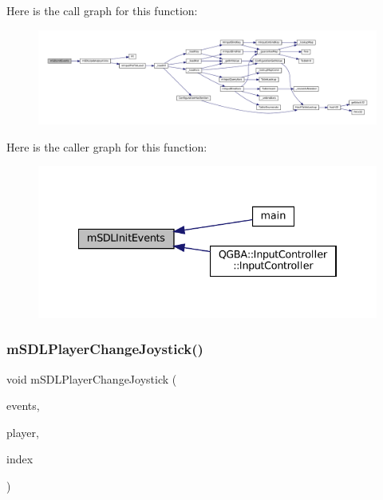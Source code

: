 Here is the call graph for this function\+:
\nopagebreak
\begin{figure}[H]
\begin{center}
\leavevmode
\includegraphics[width=350pt]{sdl-events_8c_a0529db4419b332c04fea23fff2467774_cgraph}
\end{center}
\end{figure}
Here is the caller graph for this function\+:
\nopagebreak
\begin{figure}[H]
\begin{center}
\leavevmode
\includegraphics[width=334pt]{sdl-events_8c_a0529db4419b332c04fea23fff2467774_icgraph}
\end{center}
\end{figure}
\mbox{\label{sdl-events_8c_aed738247356e33dc5bf0ba5cff942a42}} 
\subsubsection{\texorpdfstring{m\+S\+D\+L\+Player\+Change\+Joystick()}{mSDLPlayerChangeJoystick()}}
{\footnotesize\ttfamily void m\+S\+D\+L\+Player\+Change\+Joystick (\begin{DoxyParamCaption}\item[{struct \mbox{\hyperlink{sdl-events_8h_structm_s_d_l_events}{m\+S\+D\+L\+Events}} $\ast$}]{events,  }\item[{struct \mbox{\hyperlink{sdl-events_8h_structm_s_d_l_player}{m\+S\+D\+L\+Player}} $\ast$}]{player,  }\item[{size\+\_\+t}]{index }\end{DoxyParamCaption})}

